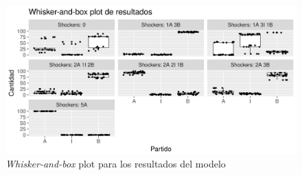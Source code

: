 \begin{figure}[!h]
\centering
\includegraphics[scale=0.5]{imagenes/histograma_resultados.png}
    \caption{\textit{Whisker-and-box} plot para los resultados del modelo}
\label{fig:modelo_shock_box}
\end{figure}


